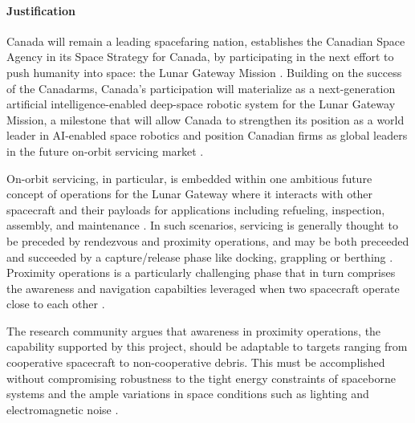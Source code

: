 \documentclass[11pt]{article}
\begin{document}
\paragraph{Justification}
Canada will remain a leading spacefaring nation, establishes the Canadian Space Agency in its Space Strategy for Canada, by participating in the next effort to push humanity into space: the Lunar Gateway Mission \cite{csaspacestrategy}.
Building on the success of the Canadarms, Canada's participation will materialize as a next-generation artificial intelligence-enabled deep-space robotic system for the Lunar Gateway Mission, a milestone that will allow Canada to strengthen its position as a world leader in AI-enabled space robotics and position Canadian firms as global leaders in the future on-orbit servicing market \cite{csaspacestrategy}.

On-orbit servicing, in particular, is embedded within one ambitious future concept of operations for the Lunar Gateway where it interacts with other spacecraft and their payloads for applications including refueling, inspection, assembly, and maintenance \cite{rhodes2023gatewayrefueling, davis2019onorbitservicing}.
In such scenarios, servicing is generally thought to be preceded by rendezvous and proximity operations, and may be both preceeded and succeeded by a capture/release phase like docking, grappling or berthing \cite{confers2019missionphases}.
Proximity operations is a particularly challenging phase that in turn comprises the awareness and navigation capabilties leveraged when two spacecraft operate close to each other \cite{faraco2024syntheticstereo,  park2022speedplus, musallam2023cubesatcdt, sam2026spacecraftsegmentation}.

The research community argues that awareness in proximity operations, the capability supported by this project, should be adaptable to targets ranging from cooperative spacecraft to non-cooperative debris. This must be accomplished without compromising robustness to the tight energy constraints of spaceborne systems and the ample variations in space conditions such as lighting and electromagnetic noise \cite{sam2026spacecraftsegmentation, park2022speedplus, musallam2023cubesatcdt, woffinden2017issselfie}.
\end{document}
